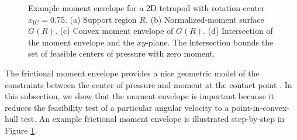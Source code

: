 \documentclass[conference]{IEEEtran}
\newcommand{\EH}[1]{{\color{blue} {Eric: {#1}}  }}
\begin{document}
\begin{figure}[t]
\begin{subfigure}[b]{0.24\textwidth}
    \caption{}
  \end{subfigure}
  \caption{Example moment envelope for a 2D tetrapod with rotation
    center $x_{\text{IC}} = 0.75$. (a) Support region $R$. (b)
    Normalized-moment surface $G(R)$. (c) Convex moment envelope of
    $G(R)$. (d) Intersection of the moment envelope and the
    $xy$-plane. The intersection bounds the set of feasible centers of
    pressure with zero moment.}
  \label{fig:moment-envelope}
\end{figure}


The frictional moment envelope provides a nice geometric model of the
constraints between the center of pressure and moment at the contact
point \cite{Mason}. In this subsection, we show that the moment
envelope is important because it reduces the feasibility test of a
particular angular velocity to a point-in-convex-hull test.
An example frictional moment envelope is illustrated step-by-step in
Figure \ref{fig:moment-envelope}.
\end{document}

